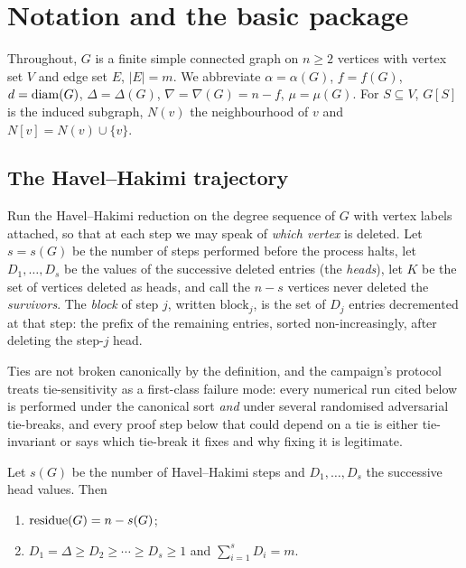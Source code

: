 \section{Notation and the basic package}\label{sec:basic}

Throughout, $G$ is a finite simple connected graph on $n \ge 2$ vertices with vertex set
$V$ and edge set $E$, $|E| = m$. We abbreviate $\alpha = \alpha(G)$, $f = f(G)$,
$d = \operatorname{diam}(G)$, $\Delta = \Delta(G)$, $\nabla = \nabla(G) = n - f$, $\mu = \mu(G)$. For
$S \subseteq V$, $G[S]$ is the induced subgraph, $N(v)$ the neighbourhood of $v$ and
$N[v] = N(v) \cup \{v\}$.

\subsection{The Havel--Hakimi trajectory}

Run the Havel--Hakimi reduction on the degree sequence of $G$ with vertex labels attached,
so that at each step we may speak of \emph{which vertex} is deleted. Let $s = s(G)$ be the
number of steps performed before the process halts, let $D_1, \dots, D_s$ be the values of
the successive deleted entries (the \emph{heads}), let $K$ be the set of vertices deleted
as heads, and call the $n - s$ vertices never deleted the \emph{survivors}. The
\emph{block} of step $j$, written $\mathrm{block}_j$, is the set of $D_j$ entries
decremented at that step: the prefix of the remaining entries, sorted non-increasingly,
after deleting the step-$j$ head.

Ties are not broken canonically by the definition, and the campaign's protocol treats
tie-sensitivity as a first-class failure mode: every numerical run cited below is performed
under the canonical sort \emph{and} under several randomised adversarial tie-breaks, and
every proof step below that could depend on a tie is either tie-invariant or says which
tie-break it fixes and why fixing it is legitimate.

\begin{lemma}[$\res = n - s$]\label{lem:hh}
\Selem
Let $s(G)$ be the number of Havel--Hakimi steps and $D_1,\dots,D_s$ the successive head
values. Then
\begin{enumerate}[label=\textup{(\arabic*)}]
\item $\operatorname{residue}(G) = n - s(G)$;
\item $D_1 = \Delta \ge D_2 \ge \cdots \ge D_s \ge 1$ and $\sum_{i=1}^{s} D_i = m$.
\end{enumerate}
\end{lemma}

